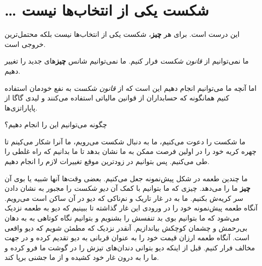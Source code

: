\section{\ldots{} شکست یکی از انتخاب‌ها
نیست}\label{ux634ux6a9ux633ux62a-ux6ccux6a9ux6cc-ux627ux632-ux627ux646ux62aux62eux627ux628ux647ux627-ux646ux6ccux633ux62a}

این درست است. برای هر \textbf{چیز}، شکست یکی از انتخاب‌ها نیست بلکه
محتمل‌ترین خروجی است.

ما نمی‌توانیم از \emph{قانون شکست} فرار کنیم. ما نمی‌توانیم شانس
\textbf{چیز}های جدید را تغییر دهیم.

اما آنچه ما می‌توانیم انجام دهیم این است که از \emph{قانون شکست} به نفع
خودمان استفاده کنیم همانگونه که حسابداران از قوانین مالیاتی استفاده
می‌کنند و لیدی گاگا از پاپاراتزی‌ها.

چگونه می‌توانیم این را انجام دهیم؟

ما شکست را دعوت می‌کنیم، ما به دنبال شکست می‌رویم، ما آنرا شکار می‌کینم
تا چهره کریه خود را در اولین فرصت ممکن به ما نشان بدهد تا ما بدانیم که
راه غلطی را طی می‌کنیم. پس بتوانیم در زودترین موقع تغییرات لازم را انجام
دهیم.

ما چندین طعمه در شکل پیش‌نمونه جعل می‌کنیم. بعضی وقت‌ها آنها شبیه یا بوی
آن \textbf{چیز} ما را می‌دهد. چیزی که ما بتوانیم با کمک آن \emph{دیو
شکست} را مجبور به نشان دادن سر کریه‌ش بکنیم. ما به در غار تاریک و
نم‌ناکی که دیو در آن ساکن است می‌رویم. آنگاه طعمه پیش‌نمونه خود را در
ورودی این غار گذاشته تا ببینیم که دیو به طعمه نزدیک می‌شود که ما بتوانیم
بوی بد تنفسش را بشنویم و بتوانیم نگاه کوتاهی به به دهان بی‌رحمش و چشمان
کوچکش بیاندازیم. آنقدر نزدیک که مطمئن شویم که دیو واقعی است. آنگاه طعمه
ارزان قیمت خود را به عنوان قربانی به دیو تقدیم کرده و در جهت مخالف فرار
کنیم. قبل از اینکه دیو بتوانی دندان‌های تیزش را در گوشت ما فرو کرده و ما
را به درون غار خود کشیده و از ما جشنی برپا کند.
